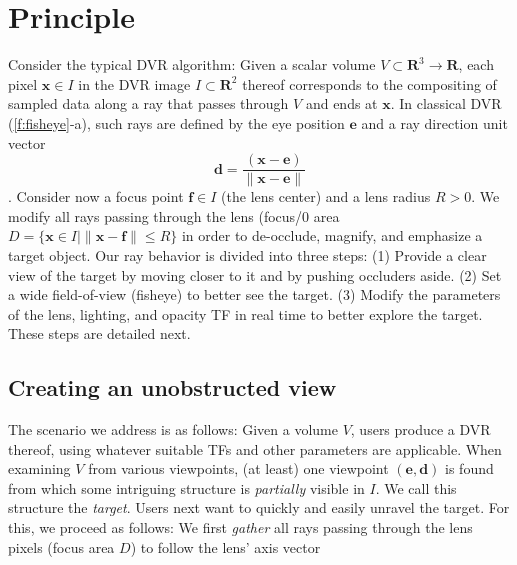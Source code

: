 \section{Principle}
\label{sec:principle}
%
%
Consider the typical DVR algorithm: Given a scalar volume $V \subset \mathbf{R}^3 \rightarrow \mathbf{R}$, each pixel $\mathbf{x} \in I$ in the DVR image $I \subset \mathbf{R}^2$ thereof corresponds to the compositing of sampled data along a ray that passes through $V$ and ends at $\mathbf{x}$. In classical DVR (\autoref{f:fisheye}-a), such rays are defined by the eye position $\mathbf{e}$ and a ray direction unit vector
\begin{equation}
\mathbf{d} = \frac{ (\mathbf{x} - \mathbf{e}) }{ \| \mathbf{x} - \mathbf{e} \| }
\end{equation}
. Consider now a focus point $\mathbf{f} \in I$ (the lens center) and a lens radius $R > 0$. We modify all rays passing through the lens (focus/0 area $D = \{\mathbf{x} \in I | \| \mathbf{x} - \mathbf{f} \| \leq R\}$ in order to de-occlude, magnify, and emphasize a target object. Our ray behavior is divided into three steps: (1) Provide a clear view of the target by moving closer to it and by pushing occluders aside. (2) Set a wide field-of-view (fisheye) to better see the target. (3) Modify the parameters of the lens, lighting, and opacity TF in real time to better explore the target. These steps are detailed next.

\subsection{Creating an unobstructed view}
\label{sec:gathering}
%
The scenario we address is as follows: Given a volume $V$, users produce a DVR thereof, using whatever suitable TFs and other parameters are applicable. When examining $V$ from various viewpoints, (at least) one viewpoint $(\mathbf{e},\mathbf{d})$ is found from which some intriguing structure is \emph{partially} visible in $I$. We call this structure the \emph{target}. Users next want to quickly and easily unravel the target. For this, we proceed as follows: We first \emph{gather} all rays passing through the lens pixels (focus area $D$) to follow the lens' axis vector

